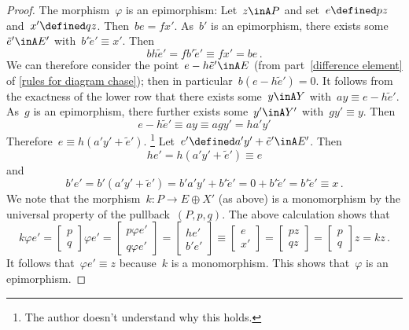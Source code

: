 \begin{proof}
  The morphism~$\varphi$ is an epimorphism:
  Let~$z \inA P$ and set~$e \defined p z$ and~$x' \defined q z$.
  Then~$b e = f x'$.
  As~$b'$ is an epimorphism, there exists some~$\tilde{e}' \inA E'$ with~$b' \tilde{e}' \equiv x'$.
  Then
  \[
    b h \tilde{e}'
    =
    f b' \tilde{e}'
    \equiv
    f x'
    =
    b e \,.
  \]
  We can therefore consider the point~$e - h \tilde{e}' \inA E$ (from part~\ref*{difference element} of \cref{rules for diagram chase});
  then in particular~$b(e - h \tilde{e}') = 0$.
  It follows from the exactness of the lower row that there exists some~$y \inA Y$ with~$a y \equiv e - h \tilde{e}'$.
  As~$g$ is an epimorphism, there further exists some~$y' \inA Y'$ with~$g y' \equiv y$.
  Then
  \[
    e - h \tilde{e}'
    \equiv
    a y
    \equiv
    a g y'
    =
    h a' y'
  \]
  Therefore~$e \equiv h (a' y' + \tilde{e}')$.%
  \footnote{The author doesn’t understand why this holds.}
  Let~$e' \defined a' y' + \tilde{e}' \inA E'$.
  Then
  \[
    h e'
    =
    h (a' y' + \tilde{e}')
    \equiv
    e
  \]
  and
  \[
    b' e'
    =
    b' (a' y' + \tilde{e}')
    =
    b' a' y' + b' \tilde{e}'
    =
    0 + b' \tilde{e}'
    =
    b' \tilde{e}'
    \equiv
    x \,.
  \]
  We note that the morphism~$k \colon P \to E \oplus X'$ (as above) is a monomorphism by the universal property of the pullback~$(P,p,q)$.
  The above calculation shows that
  \[
    k \varphi e'
    =
    \begin{bmatrix}
      p \\
      q
    \end{bmatrix}
    \varphi e'
    =
    \begin{bmatrix}
      p \varphi e'  \\
      q \varphi e'
    \end{bmatrix}
    =
    \begin{bmatrix}
      h e'  \\
      b' e'
    \end{bmatrix}
    \equiv
    \begin{bmatrix}
      e \\
      x'
    \end{bmatrix}
    =
    \begin{bmatrix}
      p z \\
      q z
    \end{bmatrix}
    =
    \begin{bmatrix}
      p \\
      q
    \end{bmatrix}
    z
    =
    k z \,.
  \]
  It follows that~$\varphi e' \equiv z$ because~$k$ is a monomorphism.
  This shows that~$\varphi$ is an epimorphism.
\end{proof}


